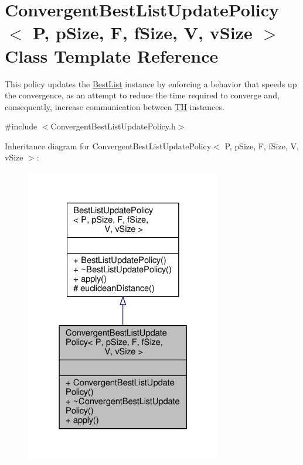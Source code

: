 \hypertarget{classConvergentBestListUpdatePolicy}{}\section{Convergent\+Best\+List\+Update\+Policy$<$ P, p\+Size, F, f\+Size, V, v\+Size $>$ Class Template Reference}
\label{classConvergentBestListUpdatePolicy}


This policy updates the \hyperlink{classBestList}{Best\+List} instance by enforcing a behavior that speeds up the convergence, as an attempt to reduce the time required to converge and, consequently, increase communication between \hyperlink{classTH}{TH} instances.  




{\ttfamily \#include $<$Convergent\+Best\+List\+Update\+Policy.\+h$>$}



Inheritance diagram for Convergent\+Best\+List\+Update\+Policy$<$ P, p\+Size, F, f\+Size, V, v\+Size $>$\+:
\nopagebreak
\begin{figure}[H]
\begin{center}
\leavevmode
\includegraphics[width=243pt]{classConvergentBestListUpdatePolicy__inherit__graph}
\end{center}
\end{figure}


